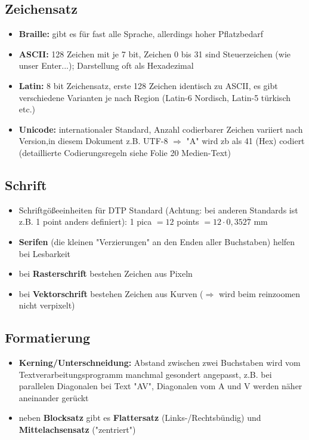 \documentclass[12pt,landscape]{article}
\begin{document}
\begin{multicols}{3}
\subsection{Zeichensatz}
\begin{itemize}
\item \textbf{Braille:} gibt es für fast alle Sprache, allerdings hoher Pflatzbedarf
\item \textbf{ASCII:} 128 Zeichen mit je 7 bit, Zeichen 0 bis 31 sind Steuerzeichen (wie unser Enter...); Darstellung oft als Hexadezimal
\item \textbf{Latin:} 8 bit Zeichensatz, erste 128 Zeichen identisch zu ASCII, es gibt verschiedene Varianten je nach Region (Latin-6 Nordisch, Latin-5 türkisch etc.)
\item \textbf{Unicode:} internationaler Standard, Anzahl codierbarer Zeichen variiert nach Version,in diesem Dokument z.B. UTF-8 $\Rightarrow$ "A" wird zb als 41 (Hex) codiert (detaillierte Codierungsregeln siehe Folie 20 Medien-Text)
\end{itemize}
\subsection{Schrift}
\begin{itemize}
\item Schriftgößeeinheiten für DTP Standard (Achtung: bei anderen Standards ist z.B. 1 point anders definiert): 1 pica $=12$ points $=12 \cdot 0,352\overline{7}$ mm 
\item \textbf{Serifen} (die kleinen "Verzierungen" an den Enden aller Buchstaben) helfen bei Lesbarkeit 
\item bei \textbf{Rasterschrift} bestehen Zeichen aus Pixeln
\item bei \textbf{Vektorschrift} bestehen Zeichen aus Kurven ($\Rightarrow$ wird beim reinzoomen nicht verpixelt)
\end{itemize}
\subsection{Formatierung}
\begin{itemize}
\item \textbf{Kerning/Unterschneidung:} Abstand zwischen zwei Buchstaben wird vom Textverarbeitungsprogramm manchmal gesondert angepasst, z.B. bei parallelen Diagonalen bei Text "AV", Diagonalen vom A und V werden näher aneinander gerückt
\item neben \textbf{Blocksatz} gibt es \textbf{Flattersatz} (Links-/Rechtsbündig) und \textbf{Mittelachsensatz} ("zentriert")
\end{itemize}

\end{multicols}
\end{document}
